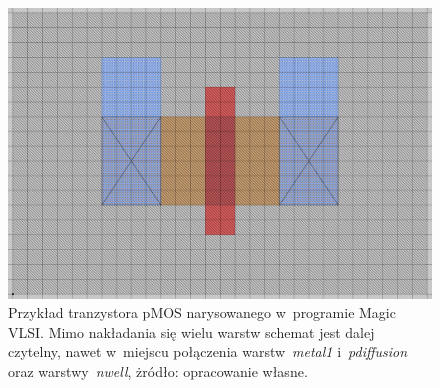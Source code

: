 \begin{figure}[h]
    \centering
    \includegraphics[width=.9\textwidth]{chapters/chapter2/img/magic_tran}
    \caption[Przykład tranzystora pMOS narysowanego w~programie Magic VLSI\@.]
    {
        Przykład tranzystora pMOS narysowanego w~programie Magic VLSI\@.
        Mimo nakładania się wielu warstw schemat jest dalej czytelny,
        nawet w~miejscu połączenia warstw~\textit{metal1} i~\textit{pdiffusion} oraz warstwy~\textit{nwell},
        żródło: opracowanie własne.
    }
    \label{fig:magic_tran}
\end{figure}
